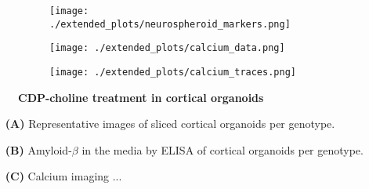 \begin{figure}[H]
    \begin{subfigure}[t]{0.7\textwidth}
        \caption{}
        \texttt{[image: ./extended\_plots/neurospheroid\_markers.png]}        
    \end{subfigure}
    \begin{subfigure}[t]{0.3\textwidth}
        \caption{}
        \texttt{[image: ./extended\_plots/calcium\_data.png]}        
    \end{subfigure}
    \begin{subfigure}[t]{0.4\textwidth}
        \caption{}
        \texttt{[image: ./extended\_plots/calcium\_traces.png]}        
    \end{subfigure}
    \caption{
        \textbf{CDP-choline treatment in cortical organoids}\\
    }
    \label{fig:neurospheroid_figure}
\end{figure}
\begin{itemize}
    \item[\textbf{(A)}] Representative images of sliced cortical organoids per genotype. 
    \item[\textbf{(B)}] Amyloid-$\beta$ in the media by ELISA of cortical organoids per genotype.
    \item[\textbf{(C)}] Calcium imaging ... 
\end{itemize}